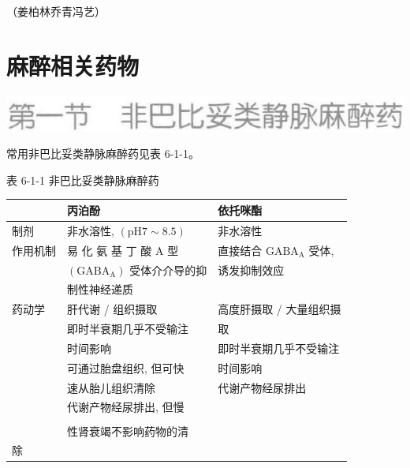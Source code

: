 \documentclass[10pt]{article}
\begin{document}
（姜柏林乔青冯艺）

\section*{麻醉相关药物}
\begin{center}
\includegraphics[max width=\textwidth]{2024_07_05_645bb794a4d4f32ee0c8g-325}
\end{center}

常用非巴比妥类静脉麻醉药见表 6-1-1。

表 6-1-1 非巴比妥类静脉麻醉药

\begin{center}
\begin{tabular}{lll}
\hline
 & 丙泊酚 & 依托咪酯 \\
\hline
制剂 & 非水溶性, $(\mathrm{pH} 7 \sim 8.5)$ & 非水溶性 \\
作用机制 & 易 化 氨 基 丁 酸 $\mathrm{A}$ 型 & 直接结合 $\mathrm{GABA}_{\mathrm{A}}$ 受体, \\
 & $\left(\mathrm{GABA}_{\mathrm{A}}\right)$ 受体介介导的抑 & 诱发抑制效应 \\
 & 制性神经递质 &  \\
药动学 & 肝代谢 / 组织摄取 & 高度肝摄取 / 大量组织摄 \\
 & 即时半衰期几乎不受输注 & 取 \\
 & 时间影响 & 即时半衰期几乎不受输注 \\
 & 可通过胎盘组织, 但可快 & 时间影响 \\
 & 速从胎儿组织清除 & 代谢产物经尿排出 \\
 & 代谢产物经尿排出, 但慢 &  \\
 &  &  \\
 & 性肾衰竭不影响药物的清 &  \\
除 &  &  \\
\hline
\end{tabular}
\end{center}
\end{document}
